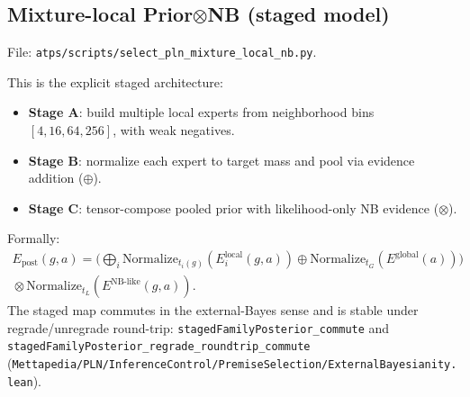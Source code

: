 \documentclass[11pt]{article}
\newcommand{\lpath}[1]{\texttt{\nolinkurl{#1}}}
\newcommand{\lid}[1]{{\ttfamily\nolinkurl{#1}}}
\begin{document}
\noindent
{}

\subsection{Mixture-local Prior\texorpdfstring{$\otimes$}{x}NB (staged model)}
File:
\lpath{atps/scripts/select_pln_mixture_local_nb.py}.

This is the explicit staged architecture:
\begin{itemize}
\item \textbf{Stage A}: build multiple local experts from neighborhood bins
      \([4,16,64,256]\), with weak negatives.
\item \textbf{Stage B}: normalize each expert to target mass and pool via
      evidence addition (\(\oplus\)).
\item \textbf{Stage C}: tensor-compose pooled prior with likelihood-only NB
      evidence (\(\otimes\)).
\end{itemize}
Formally:
\begin{multline*}
  E_{\text{post}}(g,a)=
  \Big(
    \bigoplus_i \mathrm{Normalize}_{t_i(g)}(E_i^{\text{local}}(g,a))
    \oplus \mathrm{Normalize}_{t_G}(E^{\text{global}}(a))
  \Big)\\
  {}\otimes \mathrm{Normalize}_{t_L}(E^{\text{NB-like}}(g,a)).
\end{multline*}
The staged map commutes in the external-Bayes sense and is stable under
regrade/unregrade round-trip:
\lid{stagedFamilyPosterior_commute} and
\lid{stagedFamilyPosterior_regrade_roundtrip_commute}
(\lpath{Mettapedia/PLN/InferenceControl/PremiseSelection/ExternalBayesianity.lean}).
\end{document}
